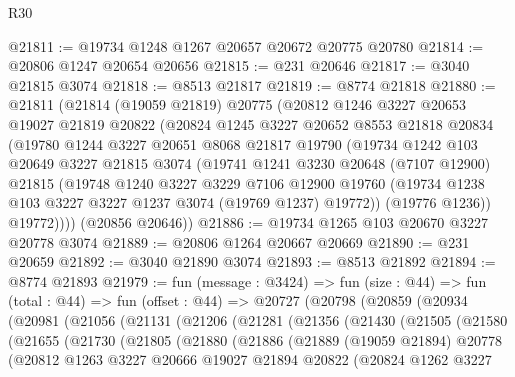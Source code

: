 \begin{lexlean}{R30}
\begin{coremodule}
@21811 := @19734 @1248 @1267 @20657 @20672 @20775 @20780
@21814 := @20806 @1247 @20654 @20656
@21815 := @231 @20646
@21817 := @3040 @21815 @3074
@21818 := @8513 @21817
@21819 := @8774 @21818
@21880 := @21811
    (@21814
      (@19059 @21819)
      @20775
      (@20812
        @1246
        @3227
        @20653
        @19027
        @21819
        @20822
        (@20824
          @1245
          @3227
          @20652
          @8553
          @21818
          @20834
          (@19780
            @1244
            @3227
            @20651
            @8068
            @21817
            @19790
            (@19734
              @1242
              @103
              @20649
              @3227
              @21815
              @3074
              (@19741
                @1241
                @3230
                @20648
                (@7107 @12900)
                @21815
                (@19748
                  @1240
                  @3227
                  @3229
                  @7106
                  @12900
                  @19760
                  (@19734 @1238 @103 @3227 @3227 @1237 @3074 (@19769 @1237) @19772))
                (@19776 @1236))
              @19772))))
      (@20856 @20646))
@21886 := @19734 @1265 @103 @20670 @3227 @20778 @3074
@21889 := @20806 @1264 @20667 @20669
@21890 := @231 @20659
@21892 := @3040 @21890 @3074
@21893 := @8513 @21892
@21894 := @8774 @21893
@21979 := fun (message : @3424) =>
  fun (size : @44) =>
  fun (total : @44) =>
  fun (offset : @44) =>
  @20727
    (@20798
      (@20859
        (@20934
          (@20981
            (@21056
              (@21131
                (@21206
                  (@21281
                    (@21356
                      (@21430
                        (@21505
                          (@21580
                            (@21655
                              (@21730
                                (@21805
                                  (@21880
                                    (@21886
                                      (@21889
                                        (@19059 @21894)
                                        @20778
                                        (@20812
                                          @1263
                                          @3227
                                          @20666
                                          @19027
                                          @21894
                                          @20822
                                          (@20824
                                            @1262
                                            @3227

\end{coremodule}
\end{lexlean}
